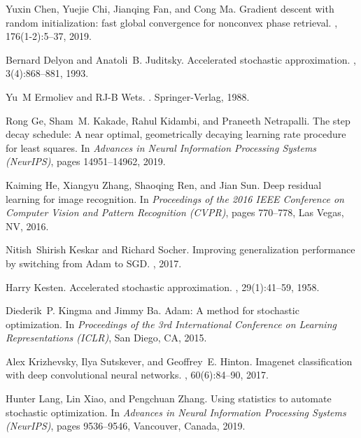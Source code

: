 \documentclass[conference]{IEEEtran}
\begin{document}
\begin{thebibliography}{10}
Yuxin Chen, Yuejie Chi, Jianqing Fan, and Cong Ma.
\newblock Gradient descent with random initialization: fast global convergence
  for nonconvex phase retrieval.
, 176(1-2):5--37, 2019.

Bernard Delyon and Anatoli~B. Juditsky.
\newblock Accelerated stochastic approximation.
, 3(4):868--881, 1993.

Yu~M Ermoliev and RJ-B Wets.
.
\newblock Springer-Verlag, 1988.

Rong Ge, Sham~M. Kakade, Rahul Kidambi, and Praneeth Netrapalli.
\newblock The step decay schedule: {A} near optimal, geometrically decaying
  learning rate procedure for least squares.
\newblock In {\em Advances in Neural Information Processing Systems (NeurIPS)},
  pages 14951--14962, 2019.

Kaiming He, Xiangyu Zhang, Shaoqing Ren, and Jian Sun.
\newblock Deep residual learning for image recognition.
\newblock In {\em Proceedings of the 2016 {IEEE} Conference on Computer Vision
  and Pattern Recognition (CVPR)}, pages 770--778, Las Vegas, NV, 2016.

Nitish~Shirish Keskar and Richard Socher.
\newblock Improving generalization performance by switching from Adam to SGD.
, 2017.

Harry Kesten.
\newblock Accelerated stochastic approximation.
, 29(1):41--59, 1958.

Diederik~P. Kingma and Jimmy Ba.
\newblock Adam: {A} method for stochastic optimization.
\newblock In {\em Proceedings of the 3rd International Conference on Learning
  Representations (ICLR)}, San Diego, CA, 2015.

Alex Krizhevsky, Ilya Sutskever, and Geoffrey~E. Hinton.
\newblock Imagenet classification with deep convolutional neural networks.
, 60(6):84--90, 2017.

Hunter Lang, Lin Xiao, and Pengchuan Zhang.
\newblock Using statistics to automate stochastic optimization.
\newblock In {\em Advances in Neural Information Processing Systems (NeurIPS)},
  pages 9536--9546, Vancouver, Canada, 2019.


\end{thebibliography}
\end{document}
